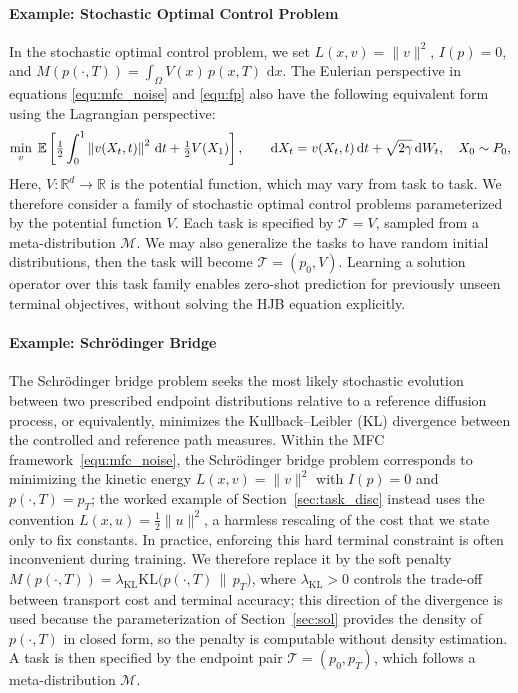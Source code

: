 \documentclass[preprint]{elsarticle}
\newcommand{\rd}{\mathrm{d}}
\newcommand{\dd}{\,\mathrm{d}}          \newcommand{\pdv}[2]{\dfrac{\partial #1}{\partial #2}}
\newcommand{\E}{\mathbb{E}}
\newcommand{\g}{\gamma}
\begin{document}
\paragraph{Example: Stochastic Optimal Control Problem}
In the stochastic optimal control problem, we set $L(x,v)=\|v\|^2$, $I(p)=0$, and $M(p(\cdot,T)) = \int_{\Omega} V(x)\,p(x,T)\,\dd x$. The Eulerian perspective in equations \eqref{equ:mfc_noise} and \eqref{equ:fp} also have the following equivalent form using the Lagrangian perspective:
\begin{equation}
\min_v\;
\E\left[\tfrac12\int_0^1\norm{v(X_t,t)}^2\dd t+\tfrac12 V(X_1)\right],
\qquad
\rd X_t=v(X_t,t)\,\rd t+\sqrt{2\g}\,\rd W_t,
\quad X_0\sim P_0,
\end{equation}
Here, $V:\mathbb R^d\to\mathbb R$ is the potential function, which may vary from task to task. We therefore consider a family of stochastic optimal control problems parameterized by the potential function $V$. Each task is specified by $\mathcal T = V$, sampled from a meta-distribution $\mathcal M$. We may also generalize the tasks to have random initial distributions, then the task will become $\mathcal T = (p_0,V)$. Learning a solution operator over this task family enables zero-shot prediction for previously unseen terminal objectives, without solving the HJB equation explicitly.

\paragraph{Example: Schr\"odinger Bridge}
The Schr\"odinger bridge problem seeks the most likely stochastic evolution between two prescribed endpoint distributions relative to a reference diffusion process, or equivalently, minimizes the Kullback--Leibler (KL) divergence between the controlled and reference path measures. Within the MFC framework~\eqref{equ:mfc_noise}, the Schr\"odinger bridge problem corresponds to minimizing the kinetic energy $L(x,v)=\|v\|^2$ with $I(p)=0$ and $p(\cdot,T)=p_T$; the worked example of Section~\ref{sec:task_disc} instead uses the convention $L(x,u)=\frac12\|u\|^2$, a harmless rescaling of the cost that we state only to fix constants. In practice, enforcing this hard terminal constraint is often inconvenient during training. We therefore replace it by the soft penalty $M(p(\cdot,T)) = \lambda_{\mathrm{KL}} \mathrm{KL}\bigl(p(\cdot,T)\,\|\,p_T\bigr)$, where $\lambda_{\mathrm{KL}}>0$ controls the trade-off between transport cost and terminal accuracy; this direction of the divergence is used because the parameterization of Section~\ref{sec:sol} provides the density of $p(\cdot,T)$ in closed form, so the penalty is computable without density estimation. A task is then specified by the endpoint pair $\mathcal T=(p_0,p_T)$, which follows a meta-distribution $\mathcal M$.
\end{document}
